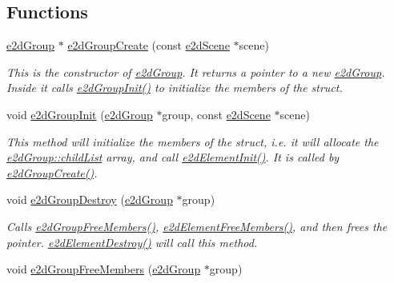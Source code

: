 \subsection*{Functions}
\begin{DoxyCompactItemize}
\item 
\hyperlink{structe2d_group}{e2d\-Group} $\ast$ \hyperlink{group__e2d_group_gaea870c0efafe302d65baaec0b028c6fb}{e2d\-Group\-Create} (const \hyperlink{structe2d_scene}{e2d\-Scene} $\ast$scene)
\begin{DoxyCompactList}\small\item\em This is the constructor of \hyperlink{structe2d_group}{e2d\-Group}. It returns a pointer to a new \hyperlink{structe2d_group}{e2d\-Group}. Inside it calls \hyperlink{group__e2d_group_ga25406e9ff8a7746af03833e40ccf259a}{e2d\-Group\-Init()} to initialize the members of the struct. \end{DoxyCompactList}\item 
void \hyperlink{group__e2d_group_ga25406e9ff8a7746af03833e40ccf259a}{e2d\-Group\-Init} (\hyperlink{structe2d_group}{e2d\-Group} $\ast$group, const \hyperlink{structe2d_scene}{e2d\-Scene} $\ast$scene)
\begin{DoxyCompactList}\small\item\em This method will initialize the members of the struct, i.\-e. it will allocate the \hyperlink{structe2d_group_a55f6dde874716dc99dcd270fc0999a01}{e2d\-Group\-::child\-List} array, and call \hyperlink{group__e2d_element_ga8734d10ef40a380dfc51bfe1790a92a7}{e2d\-Element\-Init()}. It is called by \hyperlink{group__e2d_group_gaea870c0efafe302d65baaec0b028c6fb}{e2d\-Group\-Create()}. \end{DoxyCompactList}\item 
void \hyperlink{group__e2d_group_ga545626effa0f89b72f244e56aadb05bc}{e2d\-Group\-Destroy} (\hyperlink{structe2d_group}{e2d\-Group} $\ast$group)
\begin{DoxyCompactList}\small\item\em Calls \hyperlink{group__e2d_group_ga9569da6e74703187306878ec830d52c4}{e2d\-Group\-Free\-Members()}, \hyperlink{group__e2d_element_gae8da5104d70a09549ca74044dda8313c}{e2d\-Element\-Free\-Members()}, and then frees the pointer. \hyperlink{group__e2d_element_ga214c437a16fe6f3fc795539f851a2019}{e2d\-Element\-Destroy()} will call this method. \end{DoxyCompactList}\item 
void \hyperlink{group__e2d_group_ga9569da6e74703187306878ec830d52c4}{e2d\-Group\-Free\-Members} (\hyperlink{structe2d_group}{e2d\-Group} $\ast$group)

\end{DoxyCompactItemize}
